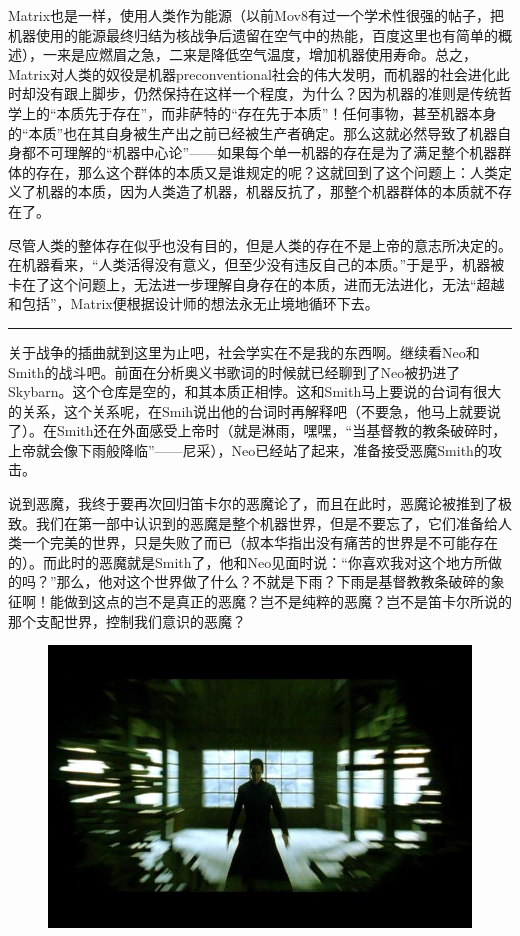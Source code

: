 \documentclass[UTF8]{ctexart}
\newcommand{\myparsep}{\noindent \rule[0.5ex]{\linewidth}{1pt}}
\begin{document}
Matrix也是一样，使用人类作为能源（以前Mov8有过一个学术性很强的帖子，把机器使用的能源最终归结为核战争后遗留在空气中的热能，百度这里也有简单的概述），一来是应燃眉之急，二来是降低空气温度，增加机器使用寿命。总之，Matrix对人类的奴役是机器preconventional社会的伟大发明，而机器的社会进化此时却没有跟上脚步，仍然保持在这样一个程度，为什么？因为机器的准则是传统哲学上的“本质先于存在”，而非萨特的“存在先于本质”！任何事物，甚至机器本身的“本质”也在其自身被生产出之前已经被生产者确定。那么这就必然导致了机器自身都不可理解的“机器中心论”——如果每个单一机器的存在是为了满足整个机器群体的存在，那么这个群体的本质又是谁规定的呢？这就回到了这个问题上：人类定义了机器的本质，因为人类造了机器，机器反抗了，那整个机器群体的本质就不存在了。

尽管人类的整体存在似乎也没有目的，但是人类的存在不是上帝的意志所决定的。在机器看来，“人类活得没有意义，但至少没有违反自己的本质。”于是乎，机器被卡在了这个问题上，无法进一步理解自身存在的本质，进而无法进化，无法“超越和包括”，Matrix便根据设计师的想法永无止境地循环下去。

\myparsep

关于战争的插曲就到这里为止吧，社会学实在不是我的东西啊。继续看Neo和Smith的战斗吧。前面在分析奥义书歌词的时候就已经聊到了Neo被扔进了Skybarn。这个仓库是空的，和其本质正相悖。这和Smith马上要说的台词有很大的关系，这个关系呢，在Smih说出他的台词时再解释吧（不要急，他马上就要说了）。在Smith还在外面感受上帝时（就是淋雨，嘿嘿，“当基督教的教条破碎时，上帝就会像下雨般降临”——尼采），Neo已经站了起来，准备接受恶魔Smith的攻击。

说到恶魔，我终于要再次回归笛卡尔的恶魔论了，而且在此时，恶魔论被推到了极致。我们在第一部中认识到的恶魔是整个机器世界，但是不要忘了，它们准备给人类一个完美的世界，只是失败了而已（叔本华指出没有痛苦的世界是不可能存在的）。而此时的恶魔就是Smith了，他和Neo见面时说：“你喜欢我对这个地方所做的吗？”那么，他对这个世界做了什么？不就是下雨？下雨是基督教教条破碎的象征啊！能做到这点的岂不是真正的恶魔？岂不是纯粹的恶魔？岂不是笛卡尔所说的那个支配世界，控制我们意识的恶魔？

\begin{figure}[htb]
\centering
\includegraphics[width=0.5\linewidth]{fig/e87cd31bb8fd89d7ad6e750a.jpg}
\end{figure}
\end{document}
